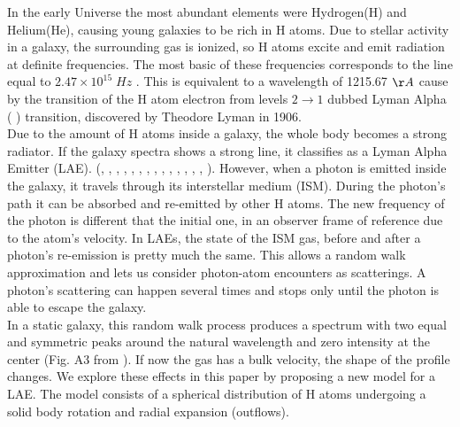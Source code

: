 \documentclass[twocolappendix]{latex/emulateapj}
\begin{document}
In the early Universe the most abundant elements were Hydrogen(H) and
Helium(He), causing young galaxies to be rich in H atoms. Due to
stellar activity in a galaxy, the surrounding gas is ionized, so H
atoms excite and emit radiation at definite frequencies. The most
basic of these frequencies corresponds to the \lya line equal to $2.47
\times 10^{15}\;Hz$ \cite{PartridgePeebles}. This is equivalent to a
wavelength of 1215.67 $\AA$ cause by the transition of the H atom
electron from levels $2\rightarrow1$ dubbed Lyman Alpha ( \lya)
transition, discovered by Theodore Lyman in 1906. \cite{LymanBio} \\ 

Due to the amount of H atoms inside a galaxy, the whole body becomes a
strong \lya radiator. If the galaxy spectra shows a strong \lya line,
it classifies as a Lyman Alpha Emitter
(LAE). (\cite{DjorgovskiThompson}, \cite{Rhoads00},
\cite{Gawiser2007}, \cite{Koehler2007}, \cite{Ouchi08},
\cite{Yamada2012}, \cite{Schenker2012}, \cite{Kulas12},
\cite{Yamada2012}, \cite{Chonis2013}, \cite{Finkelstein2013},
\cite{Ostlin14}, \cite{Hayes2014}, \cite{Faisst2014},
\cite{Fumagalli2015}). However, when a \lya photon is emitted inside
the galaxy, it travels through its interstellar medium (ISM). During
the photon's path it can be absorbed and re-emitted by other H
atoms. The new frequency of the photon is different that the initial
one, in an observer frame of reference due to the atom's velocity. In
LAEs, the state of the ISM gas, before and after a photon's
re-emission is pretty much the same. This allows a random walk
approximation and lets us consider photon-atom encounters as
scatterings. A photon's scattering can happen several times and stops
only until the photon is able to escape the galaxy. \\ 

In a static galaxy, this random walk process produces a spectrum with
two equal and symmetric peaks around the natural \lya wavelength and
zero intensity at the center (Fig. A3 from \cite{CLARA}). If now the
gas has a bulk velocity, the shape of the \lya profile changes. We
explore these effects in this paper by proposing a new model for a
LAE. The model consists of a spherical distribution of H atoms
undergoing a solid body rotation and radial expansion (outflows). \\ 
\end{document}

